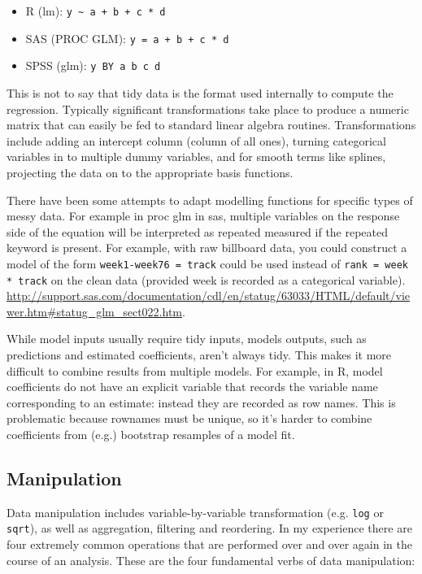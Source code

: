 \documentclass[oneside]{article}
\begin{document}
\begin{itemize}
  \item R (lm): \verb|y ~ a + b + c * d|
  \item SAS (PROC GLM): \verb|y = a + b + c * d|
  \item SPSS (glm): \verb|y BY a b c d |
\end{itemize}

This is not to say that tidy data is the format used internally to compute the regression. Typically significant transformations take place to produce a numeric matrix that can easily be fed to standard linear algebra routines.  Transformations include adding an intercept column (column of all ones), turning categorical variables in to multiple dummy variables, and for smooth terms like splines, projecting the data on to the appropriate basis functions.

There have been some attempts to adapt modelling functions for specific types of messy data. For example in {\sc proc glm} in {\sc sas}, multiple variables on the response side of the equation will be interpreted as repeated measured if the {\sc repeated} keyword is present.  For example, with raw billboard data, you could construct a model of the form \verb|week1-week76 = track| could be used instead of \verb|rank = week * track| on the clean data (provided week is recorded as a categorical variable). \url{http://support.sas.com/documentation/cdl/en/statug/63033/HTML/default/viewer.htm#statug_glm_sect022.htm}.

While model inputs usually require tidy inputs, models outputs, such as predictions and estimated coefficients, aren't always tidy. This makes it more difficult to combine results from multiple models. For example, in R, model coefficients do not have an explicit variable that records the variable name corresponding to an estimate: instead they are recorded as row names.  This is problematic because rownames must be unique, so it's harder to combine coefficients from (e.g.) bootstrap resamples of a model fit.

\subsection{Manipulation}

Data manipulation includes variable-by-variable transformation (e.g. {\tt log} or {\tt sqrt}), as well as aggregation, filtering and reordering. In my experience there are four extremely common operations that are performed over and over again in the course of an analysis. These are the four fundamental verbs of data manipulation:
\end{document}
